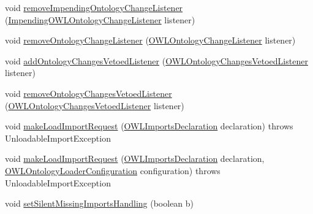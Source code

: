\begin{DoxyCompactItemize}
\item 
void \hyperlink{classuk_1_1ac_1_1manchester_1_1cs_1_1owl_1_1owlapi_1_1_o_w_l_ontology_manager_impl_a624fb75ff04ef2fe4f8bc1bbdf632151}{remove\-Impending\-Ontology\-Change\-Listener} (\hyperlink{interfaceorg_1_1semanticweb_1_1owlapi_1_1model_1_1_impending_o_w_l_ontology_change_listener}{Impending\-O\-W\-L\-Ontology\-Change\-Listener} listener)
\item 
void \hyperlink{classuk_1_1ac_1_1manchester_1_1cs_1_1owl_1_1owlapi_1_1_o_w_l_ontology_manager_impl_a837ef249541a74899a0fcc36afb61933}{remove\-Ontology\-Change\-Listener} (\hyperlink{interfaceorg_1_1semanticweb_1_1owlapi_1_1model_1_1_o_w_l_ontology_change_listener}{O\-W\-L\-Ontology\-Change\-Listener} listener)
\item 
void \hyperlink{classuk_1_1ac_1_1manchester_1_1cs_1_1owl_1_1owlapi_1_1_o_w_l_ontology_manager_impl_a4d86a77a1c5723fa1ae4b7a617c92ab1}{add\-Ontology\-Changes\-Vetoed\-Listener} (\hyperlink{interfaceorg_1_1semanticweb_1_1owlapi_1_1model_1_1_o_w_l_ontology_changes_vetoed_listener}{O\-W\-L\-Ontology\-Changes\-Vetoed\-Listener} listener)
\item 
void \hyperlink{classuk_1_1ac_1_1manchester_1_1cs_1_1owl_1_1owlapi_1_1_o_w_l_ontology_manager_impl_abfad01dab7b37be9f93a57ba6494d2b9}{remove\-Ontology\-Changes\-Vetoed\-Listener} (\hyperlink{interfaceorg_1_1semanticweb_1_1owlapi_1_1model_1_1_o_w_l_ontology_changes_vetoed_listener}{O\-W\-L\-Ontology\-Changes\-Vetoed\-Listener} listener)
\item 
void \hyperlink{classuk_1_1ac_1_1manchester_1_1cs_1_1owl_1_1owlapi_1_1_o_w_l_ontology_manager_impl_a5cd68f8ed15417e2efb424e9bb96c4cd}{make\-Load\-Import\-Request} (\hyperlink{interfaceorg_1_1semanticweb_1_1owlapi_1_1model_1_1_o_w_l_imports_declaration}{O\-W\-L\-Imports\-Declaration} declaration)  throws Unloadable\-Import\-Exception 
\item 
void \hyperlink{classuk_1_1ac_1_1manchester_1_1cs_1_1owl_1_1owlapi_1_1_o_w_l_ontology_manager_impl_a85d27e7ad181801efb71ac2d6e4d847c}{make\-Load\-Import\-Request} (\hyperlink{interfaceorg_1_1semanticweb_1_1owlapi_1_1model_1_1_o_w_l_imports_declaration}{O\-W\-L\-Imports\-Declaration} declaration, \hyperlink{classorg_1_1semanticweb_1_1owlapi_1_1model_1_1_o_w_l_ontology_loader_configuration}{O\-W\-L\-Ontology\-Loader\-Configuration} configuration)  throws Unloadable\-Import\-Exception 
\item 
void \hyperlink{classuk_1_1ac_1_1manchester_1_1cs_1_1owl_1_1owlapi_1_1_o_w_l_ontology_manager_impl_a90f730ae3a8af1dca8a3eb7fa17b57c2}{set\-Silent\-Missing\-Imports\-Handling} (boolean b)

\end{DoxyCompactItemize}
